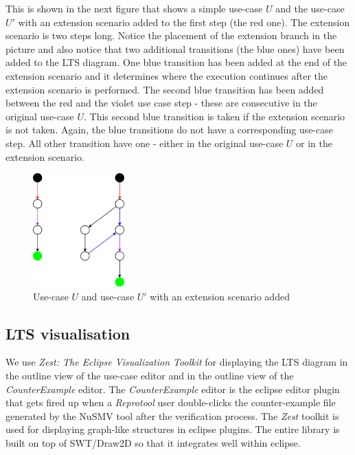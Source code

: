 This is shown in the next figure that shows a simple use-case $U$ and the use-case $U'$ with an extension scenario added
to the first step (the red one). The extension scenario is two steps long.
Notice the placement of the extension branch in the picture and also notice that two additional transitions (the blue ones) have been
added to the \ac{LTS} diagram. One blue transition has been added at the end of the extension scenario and it determines where
the execution continues after the extension scenario is performed. The second blue transition has been added between the red and the
violet use case step - these are consecutive in the original use-case $U$. This second blue transition is taken if the extension
scenario is not taken. Again, the blue transitions do not have a corresponding use-case step. All other transition have one - either
in the original use-case $U$ or in the extension scenario.

\begin{figure}[ht]
  \centering
  \includegraphics[width=100pt]{images/extension}
  \caption{Use-case $U$ and use-case $U'$ with an extension scenario added}
  \label{fig:ExtensionScenario}
\end{figure}

\subsection{\ac{LTS} visualisation}

We use \emph{Zest: The Eclipse Visualization Toolkit} for displaying the \ac{LTS} diagram in the outline view of the use-case editor and
in the outline view of the \emph{CounterExample} editor. The \emph{CounterExample} editor is the eclipse editor plugin that
gets fired up when a \emph{Reprotool} user double-clicks the counter-example file generated by the NuSMV tool after the verification
process. The \emph{Zest} toolkit is used for displaying graph-like structures in eclipse plugins. The entire library is built on top of SWT/Draw2D so that
it integrates well within eclipse.